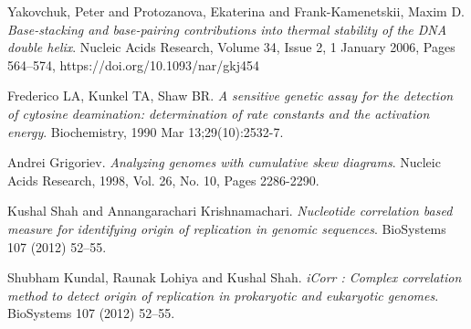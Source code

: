 \documentclass[10pt]{article}
\begin{document}
\begin{thebibliography}{9}

Yakovchuk, Peter and Protozanova, Ekaterina and Frank-Kamenetskii, Maxim D.
\textit{Base-stacking and base-pairing contributions into thermal stability of the DNA double helix}.
Nucleic Acids Research, Volume 34, Issue 2, 1 January 2006, Pages 564–574, https://doi.org/10.1093/nar/gkj454

Frederico LA, Kunkel TA, Shaw BR.
\textit{A sensitive genetic assay for the detection of cytosine deamination: determination of rate constants and the activation energy}.
Biochemistry, 1990 Mar 13;29(10):2532-7.

Andrei Grigoriev.
\textit{Analyzing genomes with cumulative skew diagrams}.
Nucleic Acids Research, 1998, Vol. 26, No. 10, Pages 2286-2290.

Kushal Shah and Annangarachari Krishnamachari.
\textit{Nucleotide correlation based measure for identifying origin of replication in genomic sequences}.
BioSystems 107 (2012) 52–55.

Shubham Kundal, Raunak Lohiya and Kushal Shah.
\textit{iCorr : Complex correlation method to detect origin of replication in prokaryotic and eukaryotic genomes}.
BioSystems 107 (2012) 52–55.


\end{thebibliography}
\end{document}
